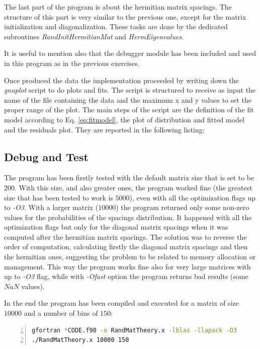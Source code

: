 \documentclass[11pt,a4paper]{article}
\begin{document}
The last part of the program is about the hermitian matrix spacings. 
The structure of this part is very similar to the previous one, except for the matrix initialization and diagonalization. 
These tasks are done by the dedicated subroutines \textit{RandInitHermitianMat} and \textit{HermEigenvalues}. 

It is useful to mention also that the debugger module has been included and used in this program as in the previous exercises. 

Once produced the data the implementation proceeded by writing down the \textit{gnuplot} script to do plots and fits. 
The script is structured to receive as input the name of the file containing the data and the maximum x and y values to set the proper range of the plot. 
The main steps of the script are the definition of the fit model according to Eq. \ref{eq:fitmodel}, the plot of distribution and fitted model and the residuals plot. They are reported in the following listing:



\subsection{Debug and Test}

The program has been firstly tested with the default matrix size that is set to be $200$. With this size, and also greater ones, the program worked fine (the greatest size that has been tested to work is $5000$), even with all the optimization flags up to \textit{-O3}. 
With a larger matrix ($10000$) the program returned only some non-zero values for the probabilities of the spacings distribution. 
It happened with all the optimization flags but only for the diagonal matrix spacings when it was computed after the hermitian matrix spacings. 
The solution was to reverse the order of computation, calculating firstly the diagonal matrix spacings and then the hermitian ones, suggesting the problem to be related to memory allocation or management.
This way the program works fine also for very large matrices with up to \textit{-O3} flag, while with \textit{-Ofast} option the program returns bad results (some $NaN$ values).

In the end the program has been compiled and executed for a matrix of size $10000$ and a number of bins of $150$:
\begin{lstlisting}[language=BASH,numbers=left]
gfortran *CODE.f90 -o RandMatTheory.x -lblas -llapack -O3
./RandMatTheory.x 10000 150
\end{lstlisting}
\end{document}
